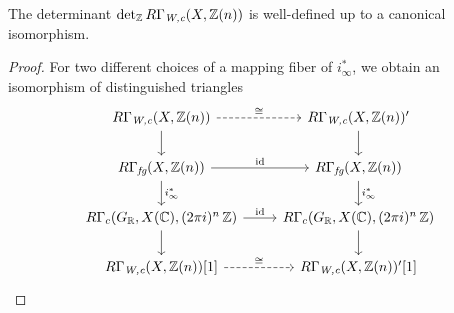 \begin{proposition}
  \label{prop:det-RGammaWc-well-defined}
  The determinant $\det\nolimits_{\mathbb{Z}} R\Gamma_\text{\it W,c} (X,\mathbb{Z} (n))$ is
  well-defined up to a canonical isomorphism.

  \begin{proof}
    For two different choices of a mapping fiber of $i_\infty^*$, we obtain an
    isomorphism of distinguished triangles
    \[ \begin{tikzcd}
        R\Gamma_\text{\it W,c} (X,\ZZ (n)) \ar{d}\ar[dashed]{r}{\isom} & R\Gamma_\text{\it W,c} (X,\ZZ (n))' \ar{d} \\
        R\Gamma_\text{\it fg} (X,\ZZ (n)) \ar{d}{i_\infty^*}\ar{r}{\idid} & R\Gamma_\text{\it fg} (X,\ZZ (n)) \ar{d}{i_\infty^*} \\
        R\Gamma_c (G_\RR, X (\CC), (2\pi i)^n\,\ZZ) \ar{d}\ar{r}{\idid} & R\Gamma_c (G_\RR, X (\CC), (2\pi i)^n\,\ZZ) \ar{d} \\
        R\Gamma_\text{\it W,c} (X,\ZZ (n)) [1]\ar[dashed]{r}{\isom} & R\Gamma_\text{\it W,c} (X,\ZZ (n))' [1]
      \end{tikzcd} \]


\end{proof}
\end{proposition}
